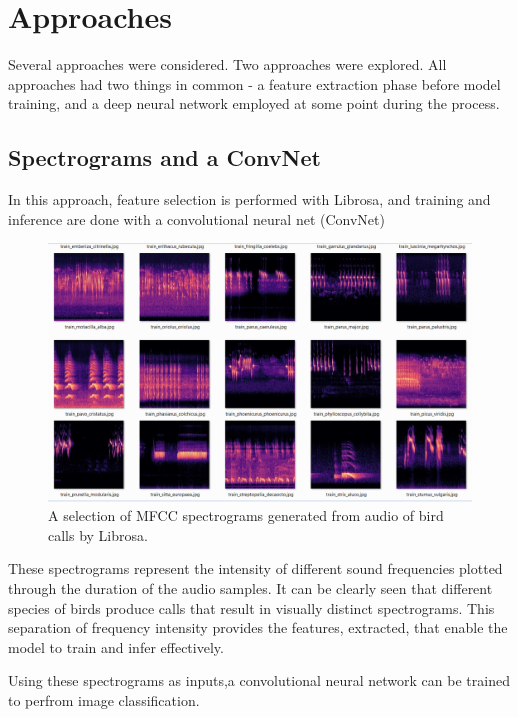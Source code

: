 \documentclass[sigconf]{acmart}
\begin{document}
\section{Approaches}

Several approaches were considered. Two approaches were explored. All approaches
had two things in common - a feature extraction phase before model training, and
a deep neural network employed at some point during the process.

\subsection{Spectrograms and a ConvNet}

In this approach, feature selection is performed with Librosa, and
training and inference are done with a convolutional neural net (ConvNet) \cite{xu20} \cite{kaggle18}

\begin{figure}[h]
  \centering
  \includegraphics[width=\linewidth]{mfccs_sample_2}
  \caption{A selection of MFCC spectrograms generated from
	audio of bird calls by Librosa.}
\end{figure}

These spectrograms represent the intensity of different sound frequencies
plotted through the duration of the audio samples. It can be clearly seen that
different species of birds produce calls that result in visually distinct spectrograms.
This separation of frequency intensity provides the features, extracted, that
enable the model to train and infer effectively.

Using these spectrograms as inputs,a convolutional neural network can be trained
to perfrom image classification.
\end{document}
